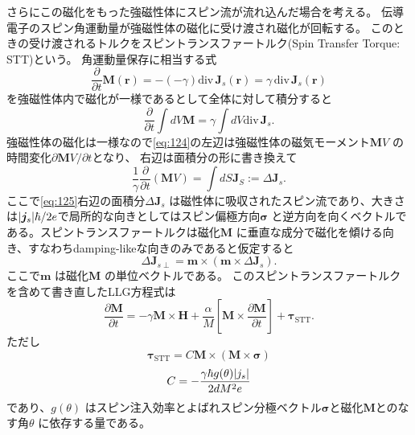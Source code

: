 \documentclass[dvipdfmx]{jsreport}
\numberwithin{equation}{chapter}
\numberwithin{table}{chapter}
\begin{document}
さらにこの磁化をもった強磁性体にスピン流が流れ込んだ場合を考える。
伝導電子のスピン角運動量が強磁性体の磁化に受け渡され磁化が回転する。
このときの受け渡されるトルクをスピントランスファートルク(Spin Transfer Torque: STT)という。
角運動量保存に相当する式
\begin{equation}
\label{eq:123}
\frac{\partial }{\partial t} \bm{M}(\bm{r})=-(-\gamma)\mathrm{div}\,\bm{J}_s(\bm{r})=\gamma\,\mathrm{div}\, \bm{J}_s(\bm{r}) 
\end{equation}
を強磁性体内で磁化が一様であるとして全体に対して積分すると
\begin{equation}
\label{eq:124}
	\frac{\partial }{\partial t} \int dV \bm{M}=\gamma \int dV \mathrm{div}\, \bm{J}_s
.\end{equation}
強磁性体の磁化は一様なので\eqref{eq:124}の左辺は強磁性体の磁気モーメント$\bm{M}V$ の時間変化$\partial \bm{M}V /\partial t$となり、
右辺は面積分の形に書き換えて
\begin{equation}
\label{eq:125}
	\frac{1}{\gamma}\frac{\partial }{\partial t} (\bm{M}V)=\int dS \bm{J}_S:=\Delta \bm{J}_s
.\end{equation}
ここで\eqref{eq:125}右辺の面積分$\Delta \bm{J}_s$ は磁性体に吸収されたスピン流であり、大きさは$\abs{\bm{j}_s}\hbar /2e$で局所的な向きとしてはスピン偏極方向$\bm{\sigma}$ と逆方向を向くベクトルである。スピントランスファートルクは磁化$\bm{M}$ に垂直な成分で磁化を傾ける向き、すなわちdamping-likeな向きのみであると仮定すると
\begin{equation}
\label{eq:126}
	\Delta \bm{J}_{s\perp}=\bm{m}\times (\bm{m}\times \Delta \bm{J}_s)
.\end{equation}
ここで$\bm{m}$ は磁化$\bm{M}$ の単位ベクトルである。
このスピントランスファートルクを含めて書き直したLLG方程式は
\begin{equation}
\label{eq:127}
\frac{\partial \bm{M}}{\partial t} =-\gamma\bm{M}\times \bm{H}+\frac{\alpha}{M}\left[ \bm{M}\times \frac{\partial \bm{M}}{\partial t}  \right] +\bm{\tau}_\text{STT} 
.\end{equation}
ただし
\begin{equation}
\label{eq:128}
	\bm{\tau}_{\text{STT} }=C \bm{M}\times (\bm{M}\times \bm{\sigma})
\end{equation}
\begin{equation}
\label{eq:129}
	C=-\frac{\gamma\hbar g(\theta) \abs{j_s}}{2dM^2e}
\end{equation}
であり、$g(\theta)$ はスピン注入効率とよばれスピン分極ベクトル$\bm{\sigma}$と磁化$\bm{M}$とのなす角$\theta$ に依存する量である\cite{ku}。
\end{document}
